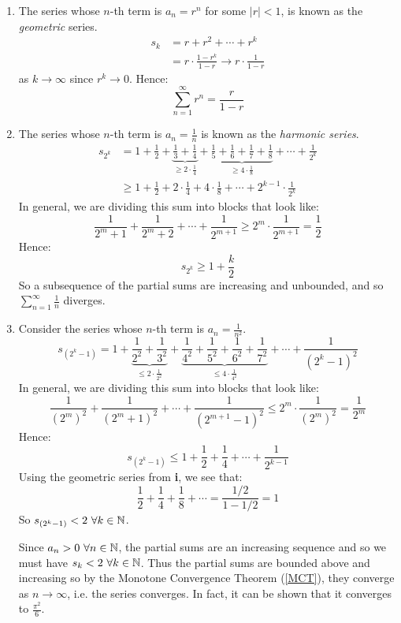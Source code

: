 \documentclass[../main.tex]{subfiles}
\begin{document}
\begin{example}
  \begin{enumerate}
    \item The series whose $n$-th term is $a_n = r^{n}$ for some $|r| < 1$, is known as the \textit{geometric} series.
      \begin{align*}
        s_k &= r + r^2 + \cdots + r^{k} \\
            &= r \cdot \frac{1 - r^{k}}{1 -r} \to r \cdot \frac{1}{1 - r}
      \end{align*}
      as $k \to \infty$ since $r^{k} \to 0$.
      Hence:
      \[
        \sum_{n = 1}^{\infty} r^{n} = \frac{r}{1 - r}
      \]
    \item The series whose $n$-th term is $a_n = \frac{1}{n}$ is known as the \textit{harmonic series}.
      \begin{align*}
        s_{2^{k}} &= 1 + \frac{1}{2} + \underbrace{\frac{1}{3} + \frac{1}{4}}_{\geq 2 \cdot \frac{1}{4}} + \underbrace{\frac{1}{5} + \frac{1}{6} + \frac{1}{7} + \frac{1}{8}}_{\geq 4\cdot \frac{1}{8}} + \cdots + \frac{1}{2^{k}} \\
                  &\geq 1 + \frac{1}{2} + 2 \cdot \frac{1}{4} + 4 \cdot \frac{1}{8} + \cdots + 2^{k - 1} \cdot\frac{1}{2^{k}}
      \end{align*}
      In general, we are dividing this sum into blocks that look like:
      \[
        \frac{1}{2^{m} + 1} + \frac{1}{2^{m} + 2} + \cdots + \frac{1}{2^{m + 1}} \geq 2^{m} \cdot \frac{1}{2^{m + 1}} = \frac{1}{2}
      \]
      Hence:
      \[
        s_{2^{k}} \geq 1 + \frac{k}{2}
      \]
      So a subsequence of the partial sums are increasing and unbounded, and so $\sum_{n=1}^{\infty} \frac{1}{n}$ diverges.
    \item Consider the series whose $n$-th term is $a_n = \frac{1}{n^2}$.
      \[
        s_{(2^{k} - 1)} = 1 + \underbrace{\frac{1}{2^{2}} + \frac{1}{3^{2}}}_{\leq 2 \cdot \frac{1}{2^{2}}} + \underbrace{\frac{1}{4^{2}} + \frac{1}{5^{2}} + \frac{1}{6^{2}} + \frac{1}{7^{2}}}_{\leq 4\cdot \frac{1}{4^{2}}} + \cdots + \frac{1}{(2^{k} - 1)^2}
      \]
      In general, we are dividing this sum into blocks that look like:
      \[
        \frac{1}{(2^{m})^2} + \frac{1}{(2^{m} + 1)^2} + \cdots + \frac{1}{(2^{m + 1} - 1)^2} \leq 2^{m} \cdot \frac{1}{(2^{m})^2} = \frac{1}{2^{m}}
      \]
      Hence:
      \[
        s_{(2^{k} - 1)} \leq 1 + \frac{1}{2} + \frac{1}{4} + \cdots + \frac{1}{2^{k - 1}}
      \]
      Using the geometric series from \textbf{i}, we see that:
      \[
        \frac{1}{2} + \frac{1}{4} + \frac{1}{8} + \cdots = \frac{1/2}{1 - 1/2} = 1
      \]
      So $s_{(2^{k} - 1)} < 2\ \forall k \in \mathbb{N}$.

      Since  $a_n > 0\ \forall n \in \mathbb{N}$, the partial sums are an increasing sequence and so we must have $s_k < 2\ \forall k \in \mathbb{N}$.
      Thus the partial sums are bounded above and increasing so by the Monotone Convergence Theorem (\cref{MCT}), they converge as $n \to \infty$, i.e. the series converges.
      In fact, it can be shown that it converges to $\frac{\pi^2}{6}$.
  \end{enumerate}
\end{example}
\end{document}
